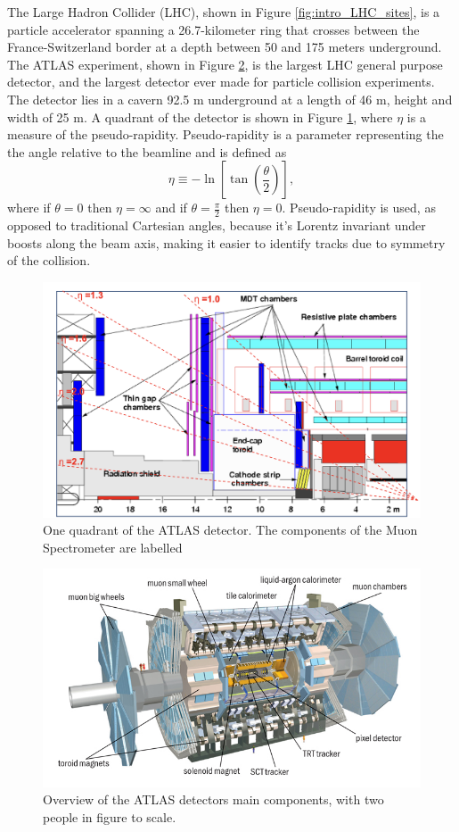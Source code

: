 The Large Hadron Collider (LHC), shown in Figure \ref{fig:intro_LHC_sites},  is a particle accelerator spanning a 26.7-kilometer ring that crosses between the France-Switzerland border at a depth between 50 and 175 meters underground.\cite{Bruning:782076}
The ATLAS experiment, shown in Figure \ref{fig:intro_ATLAS_detector}, is the largest LHC general purpose detector, and the largest detector ever made for particle collision experiments. 
The detector lies in a cavern 92.5 m underground at a length of 46 m, height and width of 25 m.\cite{ATLAS_Tech_Proposal}
A quadrant of the detector is shown in Figure \ref{fig:ATLAS_quadrant}, where $\eta$ is a measure of the pseudo-rapidity.
Pseudo-rapidity is a parameter representing the the angle relative to the beamline and is defined as
\begin{equation}
    \eta \equiv -\ln\left[ \tan\left(\frac{\theta}{2}\right)\right],
\end{equation}  
where if $\theta = 0$ then $\eta = \infty$ and if $\theta = \frac{\pi}{2}$ then $\eta = 0$.
Pseudo-rapidity is used, as opposed to traditional Cartesian angles, because it's Lorentz invariant under boosts along the beam axis, making it easier to identify tracks due to symmetry of the collision.  
\begin{figure}[h!]
    \centering
    \includegraphics[width=.8\textwidth]{content/img/ATLAS qudrant labelled MS.png}
    \caption{One quadrant of the ATLAS detector. The components of the Muon Spectrometer are labelled \cite{Hough_Transform_CSC}}
    \label{fig:ATLAS_quadrant}
\end{figure}

\begin{figure}[h]
    \centering
    \includegraphics[width=.8\textwidth]{content/img/ATLAS_Detector.jpg}
    \caption{Overview of the ATLAS detectors main components, with two people in figure to scale.\cite{ATLAS_Illustration}}
    \label{fig:intro_ATLAS_detector}
\end{figure}

